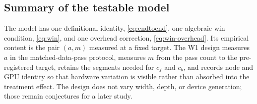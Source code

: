 \subsection{Summary of the testable model}

The model has one definitional identity, \eqref{eq:endtoend}, one algebraic
win condition, \eqref{eq:win}, and one overhead correction,
\eqref{eq:win-overhead}.  Its empirical content is the pair $(a,m)$ measured at
a fixed target.  The W1 design measures $a$ in the matched-data-pass protocol,
measures $m$ from the pass count to the pre-registered target, retains the
segments needed for $c_f$ and $c_b$, and records node and GPU identity so that
hardware variation is visible rather than absorbed into the treatment effect.
The design does not vary width, depth, or device generation; those remain
conjectures for a later study.
